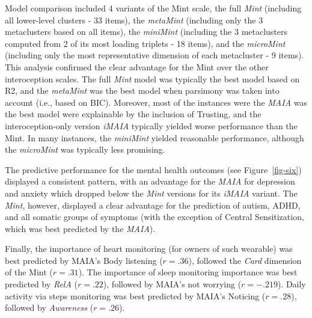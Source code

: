 \documentclass[
  jou,
  floatsintext,
  longtable,
  nolmodern,
  notxfonts,
  notimes,
  colorlinks=true,linkcolor=blue,citecolor=blue,urlcolor=blue]{apa7}
\begin{document}
Model comparison included 4 variants of the Mint scale, the full
\emph{Mint} (including all lower-level clusters - 33 items), the
\emph{metaMint} (including only the 3 metaclusters based on all items),
the \emph{miniMint} (including the 3 metaclusters computed from 2 of its
most loading triplets - 18 items), and the \emph{microMint} (including
only the most representative dimension of each metacluster - 9 items).
This analysis confirmed the clear advantage for the Mint over the other
interoception scales. The full \emph{Mint} model was typically the best
model based on R2, and the \emph{metaMint} was the best model when
parsimony was taken into account (i.e., based on BIC). Moreover, most of
the instances were the \emph{MAIA} was the best model were explainable
by the inclusion of Trusting, and the interoception-only version
\emph{iMAIA} typically yielded worse performance than the Mint. In many
instances, the \emph{miniMint} yielded reasonable performance, although
the \emph{microMint} was typically less promising.

The predictive performance for the mental health outcomes (see
Figure~\ref{fig-six}) displayed a consistent pattern, with an advantage
for the \emph{MAIA} for depression and anxiety which dropped below the
\emph{Mint} versions for its \emph{iMAIA} variant. The \emph{Mint},
however, displayed a clear advantage for the prediction of autism, ADHD,
and all somatic groups of symptoms (with the exception of Central
Sensitization, which was best predicted by the \emph{MAIA}).

Finally, the importance of heart monitoring (for owners of such
wearable) was best predicted by MAIA's Body listening (\(r = .36\)),
followed the \emph{Card} dimension of the Mint (\(r = .31\)). The
importance of sleep monitoring importance was best predicted by
\emph{RelA} (\(r = .22\)), followed by MAIA's not worrying
(\(r = -.219\)). Daily activity via steps monitoring was best predicted
by MAIA's Noticing (\(r = .28\)), followed by \emph{Awareness}
(\(r = .26\)).
\end{document}
